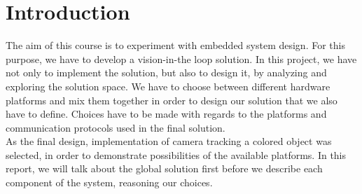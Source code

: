 \newpage
\section{Introduction}
The aim of this course is to experiment with embedded system design. For this purpose, we have to develop a vision-in-the loop solution. In this project, we have not only to implement the solution, but also to design it, by analyzing and exploring the solution space. We have to choose between different hardware platforms and mix them together in order to design our solution that we also have to define. Choices have to be made with regards to the platforms and communication protocols used in the final solution.\\

As the final design, implementation of camera tracking a colored object was selected, in order to demonstrate possibilities of the available platforms. In this report, we will talk about the global solution first before we describe each component of the system, reasoning our choices.


